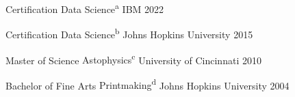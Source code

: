 

\begin{cvhonors}

  \cvhonor
    {Certification}
    {Data Science\textsuperscript{a}}
    {IBM} %
    {2022} %

  \cvhonor
    {Certification}
    {Data Science\textsuperscript{b}}
    {Johns Hopkins University} %
    {2015} %

  \cvhonor
    {Master of Science}
    {Astophysics\textsuperscript{c}}
    {University of Cincinnati} %
    {2010} %

\cvhonor
  {Bachelor of Fine Arts} %
  {Printmaking\textsuperscript{d}}
  {Johns Hopkins University} %
  {2004} %

\end{cvhonors}
